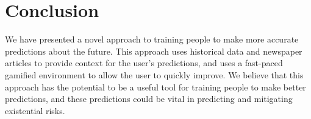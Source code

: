 \documentclass{article}
\begin{document}
\section{Conclusion}

We have presented a novel approach to training people to make more accurate predictions about the future. This approach uses historical data and newspaper articles to provide context for the user's predictions, and uses a fast-paced gamified environment to allow the user to quickly improve. We believe that this approach has the potential to be a useful tool for training people to make better predictions, and these predictions could be vital in predicting and mitigating existential risks.

{}

\end{document}
